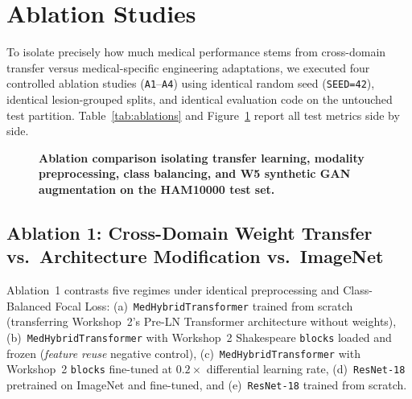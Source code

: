 \section{Ablation Studies}
\label{sec:ablations}

To isolate precisely how much medical performance stems from cross-domain transfer versus medical-specific engineering adaptations, we executed four controlled ablation studies (\texttt{A1}--\texttt{A4}) using identical random seed (\texttt{SEED=42}), identical lesion-grouped splits, and identical evaluation code on the untouched test partition. Table~\ref{tab:ablations} and Figure~\ref{fig:ablation_comp} report all test metrics side by side.

\begin{table}[htbp]
\centering
\caption{\textbf{Controlled ablation studies (A1--A4) on the untouched HAM10000 test set.} All runs share identical lesion-grouped splits, seed 42, and validation-fitted calibration.}
\label{tab:ablations}
\small

\end{table}

\begin{figure}[htbp]
\centering
{}
\caption{\textbf{Ablation comparison isolating transfer learning, modality preprocessing, class balancing, and W5 synthetic GAN augmentation on the HAM10000 test set.}}
\label{fig:ablation_comp}
\end{figure}

\subsection{Ablation 1: Cross-Domain Weight Transfer vs.\ Architecture Modification vs.\ ImageNet}
Ablation~1 contrasts five regimes under identical preprocessing and Class-Balanced Focal Loss: (a)~\texttt{MedHybridTransformer} trained from scratch (transferring Workshop~2's Pre-LN Transformer architecture without weights), (b)~\texttt{MedHybridTransformer} with Workshop~2 Shakespeare \texttt{blocks} loaded and frozen (\emph{feature reuse} negative control), (c)~\texttt{MedHybridTransformer} with Workshop~2 \texttt{blocks} fine-tuned at $0.2\times$ differential learning rate, (d)~\texttt{ResNet-18} pretrained on ImageNet and fine-tuned, and (e)~\texttt{ResNet-18} trained from scratch.

